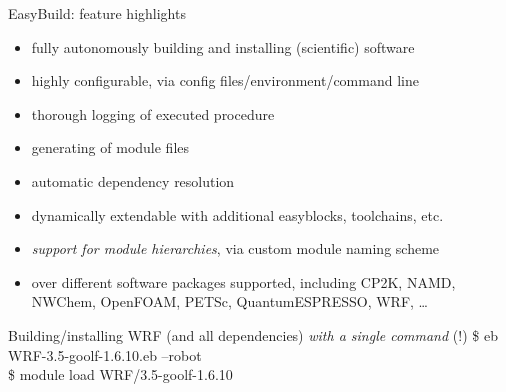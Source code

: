 \documentclass[10pt,xcolor={usenames,dvipsnames}]{beamer}
\begin{document}

\begin{frame}{EasyBuild: feature highlights}
    \begin{itemize}
        \item fully autonomously building and installing (scientific) software
        \item highly configurable, via config files/environment/command line
        \item thorough logging of executed procedure
        \item generating of module files
        \item automatic dependency resolution
        \item dynamically extendable with additional easyblocks, toolchains, etc.
        \item \emph{support for module hierarchies}, via custom module naming scheme
        \item over different software packages supported, including
              CP2K, NAMD, NWChem, OpenFOAM, PETSc, QuantumESPRESSO, WRF, \ldots
    \end{itemize}
    \begin{minipage}{0.9\textwidth}
    \begin{exampleblock}{Building/installing WRF (and all dependencies) \emph{with a single command} (!)}
        \ttfamily\small
        \$ eb WRF-3.5-goolf-1.6.10.eb --robot\\
        \$ module load WRF/3.5-goolf-1.6.10
    \end{exampleblock}
    \end{minipage}
\end{frame}

\end{document}
